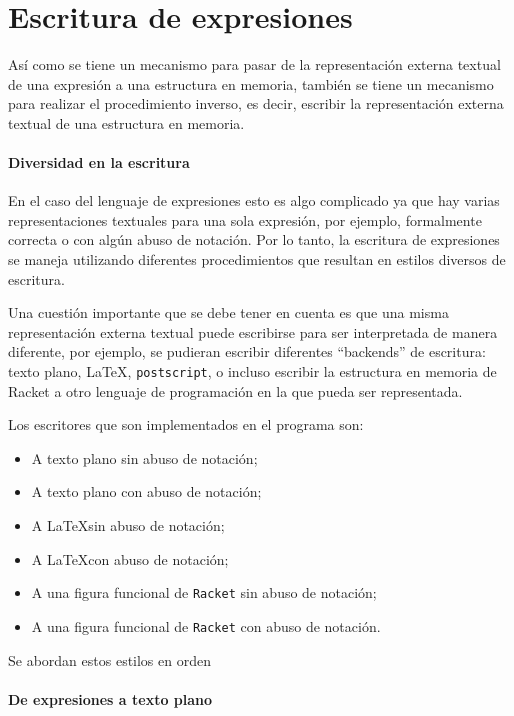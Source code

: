 \nwenddocs{}\section*{Escritura de expresiones}

Así como se tiene un mecanismo para pasar de la representación externa textual de una expresión a una estructura en memoria, también se tiene un mecanismo para realizar el procedimiento inverso, es decir, escribir la representación externa textual de una estructura en memoria.

\nwenddocs{}\paragraph{Diversidad en la escritura}
En el caso del lenguaje de expresiones esto es algo complicado ya que hay varias representaciones textuales para una sola expresión, por ejemplo, formalmente correcta o con algún abuso de notación. Por lo tanto, la escritura de expresiones se maneja utilizando diferentes procedimientos que resultan en estilos diversos de escritura.

Una cuestión importante que se debe tener en cuenta es que una misma representación externa textual puede escribirse para ser interpretada de manera diferente, por ejemplo, se pudieran escribir diferentes ``backends'' de escritura: texto plano, \LaTeX, {\tt{}postscript}, o incluso escribir la estructura en memoria de Racket a otro lenguaje de programación en la que pueda ser representada.

Los escritores que son implementados en el programa son:

\begin{itemize}
\item A texto plano sin abuso de notación;
\item A texto plano con abuso de notación;
\item A \LaTeX sin abuso de notación;
\item A \LaTeX con abuso de notación;
\item A una figura funcional de {\tt{}Racket} sin abuso de notación;
\item A una figura funcional de {\tt{}Racket} con abuso de notación.
\end{itemize}

Se abordan estos estilos en orden

\nwenddocs{}\paragraph{De expresiones a texto plano}

